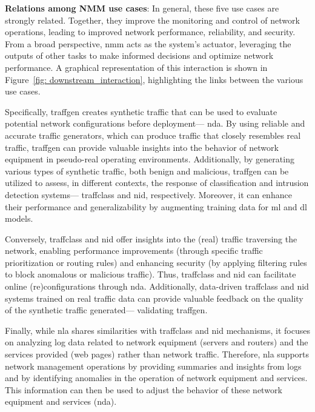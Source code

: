 \vspace{5pt}
\noindent
\textbf{Relations among NMM use cases}:
In general, these five use cases are strongly related. 
Together, they improve the monitoring and control of network operations, leading to improved network performance, reliability, and security.
From a broad perspective, \gls{nmm} acts as the system's actuator,
leveraging the outputs of other tasks to make informed decisions and optimize network performance.
A graphical representation of this interaction is shown in Figure~\ref{fig: downstream_interaction}, highlighting the links between the various use cases.

Specifically, \gls{traffgen} creates synthetic traffic that can be used to evaluate potential network configurations before deployment---%
\ie \gls{nda}. 
By using reliable and accurate traffic generators, which can produce traffic that closely resembles real traffic, \gls{traffgen} can provide valuable insights into the behavior of network equipment in pseudo-real operating environments.
Additionally, by generating various types of synthetic traffic, both benign and malicious, \gls{traffgen} can be utilized to assess, in different contexts, the response of classification and intrusion detection systems---%
\ie
\gls{traffclass} and \gls{nid}, respectively.
Moreover, it can enhance their performance and generalizability by augmenting training data for \gls{ml} and \gls{dl} models.

Conversely, \gls{traffclass} and \gls{nid} offer insights into the (real) traffic traversing the network, enabling performance improvements (through specific traffic prioritization or routing rules) and enhancing security (by applying filtering rules to block anomalous or malicious traffic). Thus, \gls{traffclass} and \gls{nid} can facilitate online (re)configurations through \gls{nda}.
Additionally, data-driven \gls{traffclass} and \gls{nid} systems trained on real traffic data can provide valuable feedback on the quality of the synthetic traffic generated---%
\ie validating \gls{traffgen}.


Finally, while \gls{nla} shares similarities with \gls{traffclass} and \gls{nid} mechanisms, it
focuses on analyzing log data related to network equipment (\eg servers and routers) and the services provided (\eg web pages) rather than network traffic.
Therefore, \gls{nla} supports network management operations by providing summaries and insights from logs and by identifying anomalies in the operation of network equipment and services. This information can then be used to adjust the behavior of these network equipment and services (\ie \gls{nda}).








